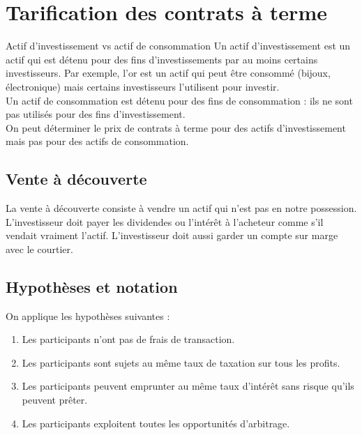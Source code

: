 \chapter{Tarification des contrats à terme}

\begin{definition}{Actif d'investissement vs actif de consommation}{}
	Un actif d'investissement est un actif qui est détenu pour des fins d'investissements par au moins certains investisseurs. Par exemple, l'or est un actif qui peut être consommé (bijoux, électronique) mais certains investisseurs l'utilisent pour investir. \\
	
	Un actif de consommation est détenu pour des fins de consommation : ils ne sont pas utilisés pour des fins d'investissement.\\
	
	On peut déterminer le prix de contrats à terme pour des actifs d'investissement mais pas pour des actifs de consommation. 
\end{definition}

\section{Vente à découverte}

La vente à découverte consiste à vendre un actif qui n'est pas en notre possession. L'investisseur doit payer les dividendes ou l'intérêt à l'acheteur comme s'il vendait vraiment l'actif. L'investisseur doit aussi garder un compte sur marge avec le courtier. 

\section{Hypothèses et notation}

On applique les hypothèses suivantes : 

\begin{enumerate}
	\item Les participants n'ont pas de frais de transaction.
	\item Les participants sont sujets au même taux de taxation sur tous les profits. 
	\item Les participants peuvent emprunter au même taux d'intérêt sans risque qu'ils peuvent prêter. 
	\item Les participants exploitent toutes les opportunités d'arbitrage. 
\end{enumerate}

